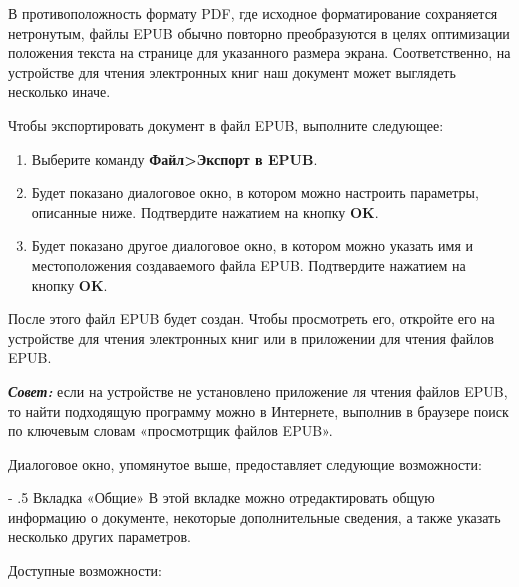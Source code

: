 ﻿\documentclass[a4paper,10pt]{article}
\makeatletter
\renewcommand\paragraph{%
   \@startsection{paragraph}{4}{0mm}%
      {-\baselineskip}%
      {.5\baselineskip}%
      {\normalfont\normalsize\bfseries}}
\makeatother
\begin{document}
В противоположность формату PDF, где исходное форматирование сохраняется нетронутым, файлы EPUB обычно повторно преобразуются в целях оптимизации положения текста на странице для указанного размера экрана. Соответственно, на устройстве для чтения электронных книг наш документ может выглядеть несколько иначе.

Чтобы экспортировать документ в файл EPUB, выполните следующее:
\begin{enumerate}
 \item Выберите команду \textbf{Файл>Экспорт в EPUB}.
 \item Будет показано диалоговое окно, в котором можно настроить параметры, описанные ниже. Подтвердите нажатием на кнопку \textbf{OK}.
 \item Будет показано другое диалоговое окно, в котором можно указать имя и местоположения создаваемого файла EPUB. Подтвердите нажатием на кнопку \textbf{OK}.
\end{enumerate}

После этого файл EPUB будет создан. Чтобы просмотреть его, откройте его на устройстве для чтения электронных книг или в приложении для чтения файлов EPUB.

\begin{mdframed}[backgroundcolor=blue!10]
\textbf{\textit{Совет:}} если на устройстве не установлено приложение ля чтения файлов EPUB, то найти подходящую программу можно в Интернете, выполнив в браузере поиск по ключевым словам «просмотрщик файлов EPUB».
\end{mdframed}

Диалоговое окно, упомянутое выше, предоставляет следующие возможности:

\paragraph{Вкладка «Общие»}
В этой вкладке можно отредактировать общую информацию о документе, некоторые дополнительные сведения, а также указать несколько других параметров.

Доступные возможности:
\end{document}
